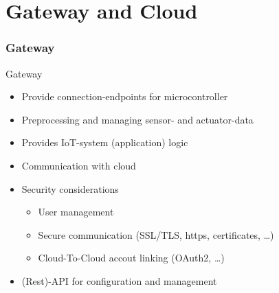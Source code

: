 ﻿\part{Gateway and Cloud}
\section[nosectionpage]{Gateway}

\begin{frame}{Gateway}
  \begin{description}[Gateway]
    \item[Gateway]
    \begin{itemize}
      \item Provide connection-endpoints for microcontroller
      \item Preprocessing and managing sensor- and actuator-data
      \item Provides IoT-system (application) logic
      \item Communication with cloud
      \item Security considerations
      \begin{itemize}
        \item User management
        \item Secure communication (SSL/TLS, https, certificates, \ldots)
        \item Cloud-To-Cloud accout linking (OAuth2, \ldots)
      \end{itemize}
      \item (Rest)-API for configuration and management
    \end{itemize}
  \end{description}
\end{frame}
